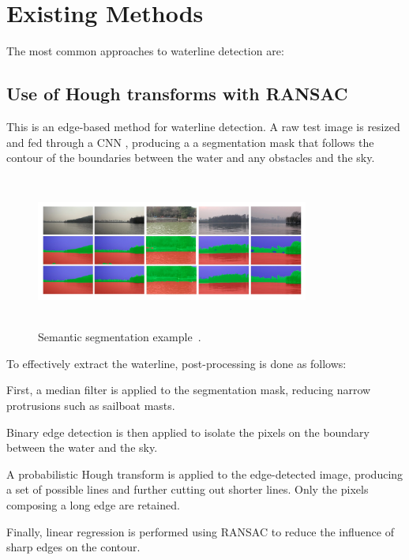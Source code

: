 \def \ransac { \textsc{RANSAC} }
\def \cnn { \textsc{CNN} }
\section{Existing Methods}
The most common approaches to waterline detection are:
\subsection{ Use of Hough transforms with \ransac}
This is an edge-based method for waterline detection.
A raw test image is resized and fed through a \cnn, producing a a segmentation mask
that follows the contour of the boundaries between the water and any obstacles
and the sky.

\begin{figure}[H]
  \includegraphics*[width=0.8\textwidth,height=50mm]{one-prelim.png}
  \caption{
    Semantic segmentation example~\cite{zhan-2020}.
  }
\end{figure}

To effectively extract the waterline, post-processing is done as follows:
\begin{enumroman}
  \item First, a median filter is applied to the segmentation mask,
    reducing narrow protrusions such as sailboat masts.
  \item Binary edge detection is then applied to isolate the pixels on the boundary
    between the water and the sky.
  \item A probabilistic Hough transform is applied to the edge-detected image,
    producing a set of possible lines and further cutting out shorter lines.
    Only the pixels composing a long edge are retained.
  \item Finally, linear regression is performed using \ransac to reduce the
    influence of sharp edges on the contour.
\end{enumroman}

